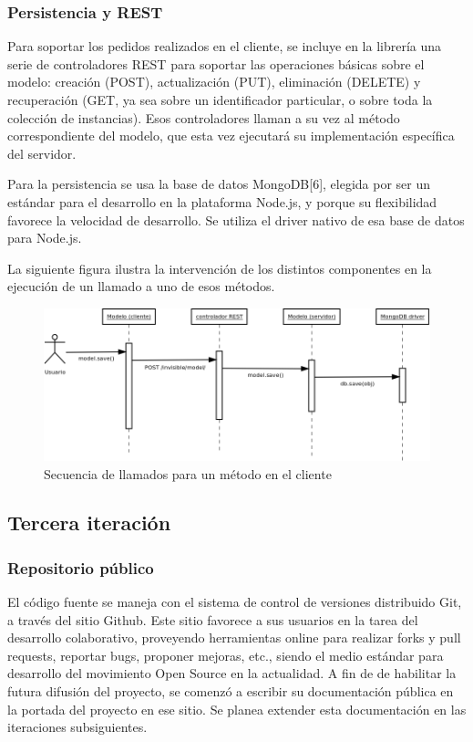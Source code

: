 \documentclass[doc,helv,longtable]{article}
\begin{document}
\subsubsection{Persistencia y REST}
Para soportar los pedidos realizados en el cliente, se incluye en la librería una serie de controladores REST para soportar las operaciones básicas sobre el modelo: creación (POST), actualización (PUT), eliminación (DELETE) y recuperación (GET, ya sea sobre un identificador particular, o sobre toda la colección de instancias). Esos controladores llaman a su vez al método correspondiente del modelo, que esta vez ejecutará su implementación específica del servidor.

Para la persistencia se usa la base de datos MongoDB[6], elegida por ser un estándar para el desarrollo en la plataforma Node.js, y porque su flexibilidad favorece la velocidad de desarrollo. Se utiliza el driver nativo de esa base de datos para Node.js\cite{nodemongo}.

La siguiente figura ilustra la intervención de los distintos componentes en la ejecución de un llamado a uno de esos métodos.

\begin{figure}[tb]
\begin{center}
\includegraphics[width=1\columnwidth]{tpprof1.png}
\caption{Secuencia de llamados para un método en el cliente}

\end{center}
\end{figure}

\subsection{Tercera iteración}
\subsubsection{Repositorio público}
El código fuente se maneja con el sistema de control de versiones distribuido Git\cite{git}, a través del sitio Github\cite{github}. Este sitio favorece a sus usuarios en la tarea del desarrollo colaborativo, proveyendo herramientas online para realizar forks y pull requests, reportar bugs, proponer mejoras, etc., siendo el medio estándar para desarrollo del movimiento Open Source en la actualidad. A fin de de habilitar la futura difusión del proyecto, se comenzó a escribir su documentación pública en la portada del proyecto en ese sitio\cite{invisible}. Se planea extender esta documentación en las iteraciones subsiguientes.
\end{document}
